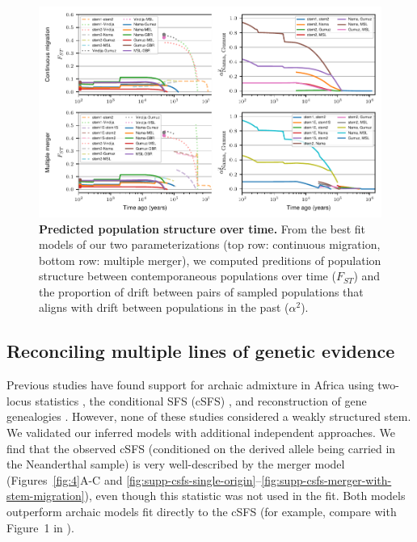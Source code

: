 \documentclass{article}
\begin{document}
\begin{figure}[t!]
    \centering
    \includegraphics{figures/fig3.pdf}
    \caption{
        \textbf{Predicted population structure over time.}
        From the best fit models of our two parameterizations (top row:
        continuous migration, bottom row: multiple merger), we computed
        preditions of population structure between contemporaneous populations
        over time ($F_{ST}$) and the proportion of drift between pairs of sampled
        populations that aligns with drift between populations in the past
        ($\alpha^2$).
    }
    \label{fig:3}
\end{figure}

\subsection*{Reconciling multiple lines of genetic evidence}

Previous studies have found support for archaic admixture in Africa using
two-locus statistics \citep{Hsieh2016-gk,Ragsdale2019-nt}, the conditional SFS
(cSFS) \citep{Durvasula2020-td}, and reconstruction of gene genealogies
\citep{Speidel2019-nj}. However, none of these studies considered a weakly
structured stem. We validated our inferred models with additional independent
approaches. We find that the observed cSFS (conditioned on the derived allele
being carried in the Neanderthal sample) is very well-described by the merger
model (Figures~\ref{fig:4}A-C and
\ref{fig:supp-csfs-single-origin}--\ref{fig:supp-csfs-merger-with-stem-migration}),
even though this statistic was not used in the fit. Both models outperform
archaic models fit directly to the cSFS (for example, compare with Figure~1 in
\citet{Durvasula2020-td}).
\end{document}
